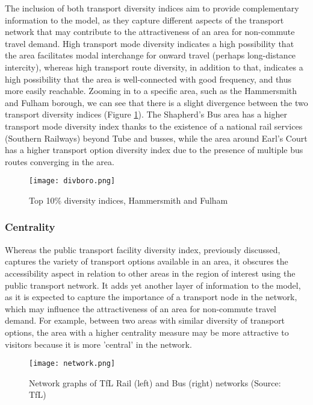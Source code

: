 The inclusion of both transport diversity indices aim to provide complementary information to the model, as they capture different aspects of the transport network that may contribute to the attractiveness of an area for non-commute travel demand. High transport mode diversity indicates a high possibility that the area facilitates modal interchange for onward travel (perhaps long-distance intercity), whereas high transport route diversity, in addition to that, indicates a high possibility that the area is well-connected with good frequency, and thus more easily reachable. Zooming in to a specific area, such as the Hammersmith and Fulham borough, we can see that there is a slight divergence between the two transport diversity indices (Figure \ref{fig:diversityboro}). The Shapherd's Bus area has a higher transport mode diversity index thanks to the existence of a national rail services (Southern Railways) beyond Tube and busses, while the area around Earl's Court has a higher transport option diversity index due to the presence of multiple bus routes converging in the area.

\begin{figure}[hbt]
    \centering
    \texttt{[image: divboro.png]}
    \captionsetup{justification=centering}
    \caption{Top 10\% diversity indices, Hammersmith and Fulham}
    \label{fig:diversityboro}
\end{figure}


\subsubsection*{Centrality}
Whereas the public transport facility diversity index, previously discussed, captures the variety of transport options available in an area, it obscures the accessibility aspect in relation to other areas in the region of interest using the public transport network. It adds yet another layer of information to the model, as it is expected to capture the importance of a transport node in the network, which may influence the attractiveness of an area for non-commute travel demand. For example, between two areas with similar diversity of transport options, the area with a higher centrality measure may be more attractive to visitors because it is more 'central' in the network. 

\begin{figure}[!ht]
    \centering
    \texttt{[image: network.png]}
    \captionsetup{justification=centering}
    \caption{Network graphs of TfL Rail (left) and Bus (right) networks (Source: TfL)}
    \label{fig:network}
\end{figure}

